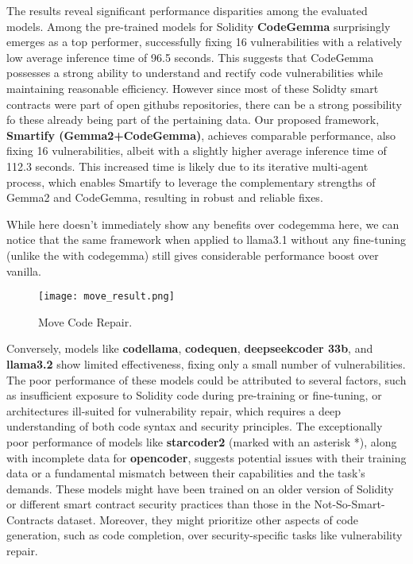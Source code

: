 The results reveal significant performance disparities among the evaluated models. Among the pre-trained models for Solidity \textbf{CodeGemma} surprisingly emerges as a top performer, successfully fixing 16 vulnerabilities with a relatively low average inference time of 96.5 seconds. This suggests that CodeGemma possesses a strong ability to understand and rectify code vulnerabilities while maintaining reasonable efficiency. However since most of these Solidty smart contracts were part of open githubs repositories, there can be a strong possibility fo these already being part of the pertaining data. Our proposed framework, \textbf{Smartify (Gemma2+CodeGemma)}, achieves comparable performance, also fixing 16 vulnerabilities, albeit with a slightly higher average inference time of 112.3 seconds. This increased time is likely due to its iterative multi-agent process, which enables Smartify to leverage the complementary strengths of Gemma2 and CodeGemma, resulting in robust and reliable fixes. 

While \sln{} here doesn't immediately show any benefits over codegemma here, we can notice that the same \sln{} framework when applied to llama3.1 without any fine-tuning (unlike the \sln{} with codegemma) still gives considerable performance boost over vanilla.


\begin{figure}
    \centering
    \texttt{[image: move\_result.png]}
    \caption{Move Code Repair.}
    \label{fig:enter-label}
\end{figure}

Conversely, models like \textbf{codellama}, \textbf{codequen}, \textbf{deepseekcoder 33b}, and \textbf{llama3.2} show limited effectiveness, fixing only a small number of vulnerabilities. The poor performance of these models could be attributed to several factors, such as insufficient exposure to Solidity code during pre-training or fine-tuning, or architectures ill-suited for vulnerability repair, which requires a deep understanding of both code syntax and security principles. The exceptionally poor performance of models like \textbf{starcoder2} (marked with an asterisk *), along with incomplete data for \textbf{opencoder}, suggests potential issues with their training data or a fundamental mismatch between their capabilities and the task's demands.  These models might have been trained on an older version of Solidity or different smart contract security practices than those in the Not-So-Smart-Contracts dataset. Moreover, they might prioritize other aspects of code generation, such as code completion, over security-specific tasks like vulnerability repair.

